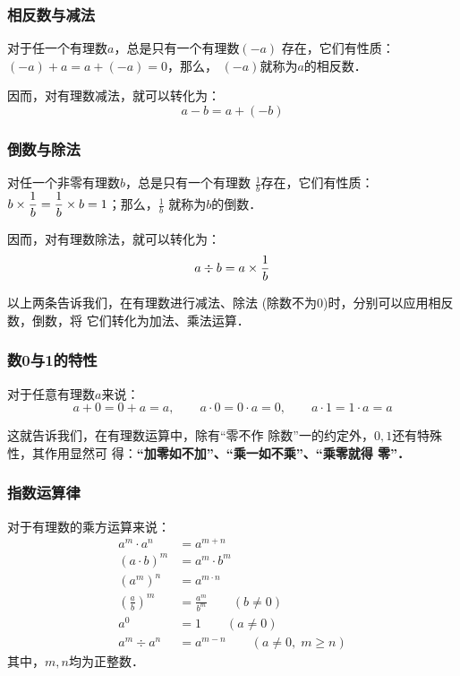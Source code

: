 \subsubsection{相反数与减法}
\begin{blk}{}
对于任一个有理数$a$，总是只有一个有理数$(-a)$
存在，它们有性质：$(-a) +a=a+(-a)=0$，那么，
$(-a)$就称为$a$的相反数．
\end{blk}

因而，对有理数减法，就可以转化为：
        \[a-b=a+(-b)\]

\subsubsection{倒数与除法}
\begin{blk}{}
 对任一个非零有理数$b$，总是只有一个有理数
$\frac{1}{b}$存在，它们有性质：$b\times\dfrac{1}{b}= \dfrac{1}{b} \times b=1$；那么，$\frac{1}{b}$
就称为$b$的倒数．
\end{blk}

因而，对有理数除法，就可以转化为：
\[a\div b=a\times\dfrac{1}{b}\]

以上两条告诉我们，在有理数进行减法、除法
(除数不为0)时，分别可以应用相反数，倒数，将
它们转化为加法、乘法运算．

\subsubsection{数0与1的特性}
\begin{blk}{}
    对于任意有理数$a$来说：
\[a+0=0+a=a,\qquad  a\cdot 0=0\cdot a=0,\qquad a\cdot 1=1\cdot a=a\]
\end{blk}

    这就告诉我们，在有理数运算中，除有“零不作
除数”一的约定外，$0,  1$还有特殊性，其作用显然可
得：\textbf{“加零如不加”、“乘一如不乘”、“乘零就得
零”．}

\subsubsection{指数运算律}
    \begin{blk}{}
    对于有理数的乘方运算来说：
\[\begin{split}
a^m\cdot a^n&=a^{m+n}\\
(a\cdot b)^m&=a^{m}\cdot b^m\\
(a^m)^n&=a^{m\cdot n}\\
\left(\frac{a}{b}\right)^m&=\frac{a^m}{b^m}\qquad (b\ne 0)\\
a^0&=1\qquad (a\ne 0)\\
a^m\div a^n&=a^{m-n} \qquad (a\ne 0,\; m\ge n)
\end{split}\]
其中，$m, n$均为正整数．
    \end{blk}

